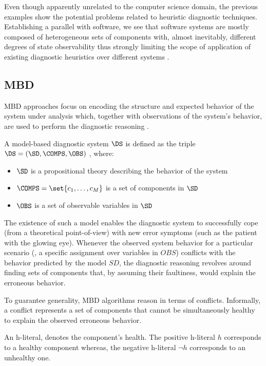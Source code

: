 Even though apparently unrelated to the computer science domain, the
previous examples show the potential problems related to heuristic
diagnostic techniques.
%
Establishing a parallel with software, we see that software systems
are mostly composed of heterogeneous sets of components with, almost
inevitably, different degrees of state observability thus strongly
limiting the scope of application of existing diagnostic heuristics
over different systems \citep{Salehie05}.

\subsection{\acl{MBD}}
\label{sec:intro:model-based-diagnosis}
\ac{MBD} approaches focus on encoding the structure and expected
behavior of the system under analysis which, together with
observations of the system's behavior, are used to perform the
diagnostic reasoning \citep{Kleer87,Reiter87}.
%
\begin{definition}
  A model-based diagnostic system $\DS$ is defined as the triple
  $\DS = (\SD, \COMPS,\OBS)$ , where:
  \begin{itemize}
  \item $\SD$ is a propositional theory describing the behavior of the system
  \item $\COMPS = \set{c_1 , \ldots, c_M }$ is a set of components in $\SD$
  \item $\OBS$ is a set of observable variables in $\SD$
  \end{itemize}
\end{definition}


The existence of such a model enables the diagnostic system to
successfully cope (from a theoretical point-of-view) with new error
symptoms (such as the patient with the glowing eye).
%
Whenever the observed system behavior for a particular scenario (\ie,
a specific assignment over variables in $OBS$) conflicts with the
behavior predicted by the model $SD$, the diagnostic reasoning
revolves around finding sets of components that, by assuming their
faultiness, would explain the erroneous behavior.

To guarantee generality, \ac{MBD} algorithms reason in terms of
conflicts.
%
Informally, a conflict represents a set of components that cannot be
simultaneously healthy to explain the observed erroneous behavior.

\begin{definition}[h-literal]
  An h-literal, denotes the component's health.
  The positive h-literal $h$ corresponds to a healthy component
  whereas, the negative h-literal $\neg h$ corresponds to an
  unhealthy one.
\end{definition}

